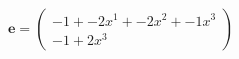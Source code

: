 \documentclass[preview]{standalone}
\begin{document}
\begin{align*}
\mathbf{e} = \begin{pmatrix}-1 + -2x^{1} + -2x^{2} + -1x^{3} \\ -1 + 2x^{3}\end{pmatrix}
\end{align*}
\end{document}
